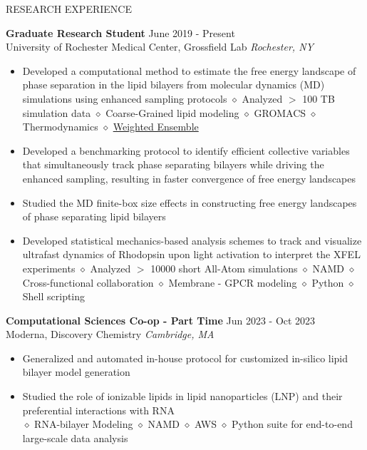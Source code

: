 \documentclass{resume} %
\begin{document}
\begin{rSection}{RESEARCH EXPERIENCE}

   \textbf{Graduate Research Student} \hfill June 2019 - Present\\
   University of Rochester Medical Center, Grossfield Lab \hfill \textit{Rochester, NY}
   \begin{itemize}
      \itemsep -2pt {}
      \item Developed a computational method to estimate the free energy landscape of phase separation in the lipid bilayers from molecular dynamics (MD) simulations using enhanced sampling protocols
            $\diamond$ Analyzed $>$ 100 TB simulation data $\diamond$ Coarse-Grained lipid modeling $\diamond$ GROMACS  $\diamond$ Thermodynamics $\diamond$ \href{https://x.com/poruthoor/status/1631815905557479426?s=20}{Weighted Ensemble}
      \item Developed a benchmarking protocol to identify efficient collective variables that simultaneously track phase separating bilayers while driving the enhanced sampling, resulting in faster convergence of free energy landscapes
      \item Studied the MD finite-box size effects in constructing free energy landscapes of phase separating lipid bilayers
      \item Developed statistical mechanics-based analysis schemes to track and visualize ultrafast dynamics of Rhodopsin upon light activation to interpret the XFEL experiments $\diamond$ Analyzed $>$ 10000 short All-Atom simulations
            $\diamond$ NAMD $\diamond$ Cross-functional collaboration $\diamond$  Membrane - GPCR modeling $\diamond$ Python $\diamond$ Shell scripting
   \end{itemize}

   \textbf{Computational Sciences Co-op - Part Time} \hfill Jun 2023 - Oct 2023\\
   Moderna, Discovery Chemistry \hfill \textit{Cambridge, MA}
   \begin{itemize}
      \itemsep -2pt {}
      \item Generalized and automated in-house protocol for customized in-silico lipid bilayer model generation
      \item Studied the role of ionizable lipids in lipid nanoparticles (LNP) and their preferential interactions with RNA \\
            $\diamond$ RNA-bilayer Modeling $\diamond$ NAMD $\diamond$ AWS $\diamond$ Python suite for end-to-end large-scale data analysis
   \end{itemize}


\end{rSection}
\end{document}
